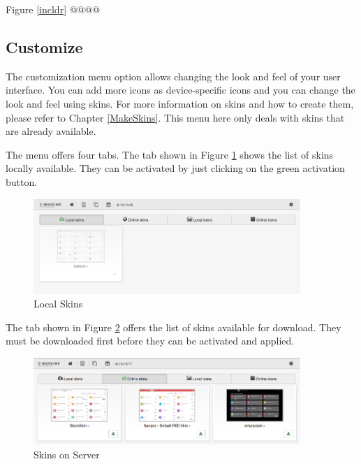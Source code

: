 Figure \ref{incldr} @@@@



\subsection{Customize}
\label{customize}


The customization menu option allows changing the look and feel of your \zway user 
interface. You can add more icons as device-specific icons and you can change the look 
and feel using skins. For more information on skins and how to create them, please refer 
to Chapter \ref{MakeSkins}. This menu here only deals with skins that are already available.

The menu offers four tabs. The tab shown in Figure \ref{shui81} shows the list of skins 
locally available. They can be activated by just clicking on the green activation button.

\begin{figure}
\begin{center}
\includegraphics[width=0.9\textwidth]{pngs/cap4/shui81.png}
\caption{Local Skins}
\label{shui81}
\end{center}
\end{figure}

The tab shown in Figure \ref{shui82} offers the list of skins available for download. 
They must be downloaded first before they can be activated and applied.

\begin{figure}
\begin{center}
\includegraphics[width=0.9\textwidth]{pngs/cap4/shui82.png}
\caption{Skins on Server}
\label{shui82}
\end{center}
\end{figure}

